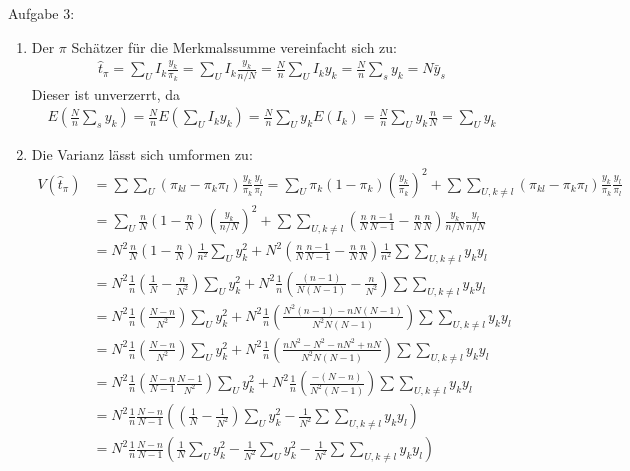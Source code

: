 \begin{Solution}{{Aufgabe 3:}}
	\begin{enumerate}
\item Der $\pi$ Schätzer für die Merkmalssumme vereinfacht sich zu:
\begin{align*}
\hat{t}_\pi = \sum_U I_k \frac{y_k}{\pi_k} = \sum_U I_k \frac{y_k}{n/N} = \frac{N}{n} \sum_U I_k y_k =  \frac{N}{n} \sum_s y_k = N \bar{y}_s
\end{align*}
Dieser ist unverzerrt, da
\begin{align*}
E\left(\frac{N}{n} \sum_s y_k\right) = \frac{N}{n} E\left(\sum_U I_k y_k\right) = \frac{N}{n} \sum_U y_k E(I_k) = \frac{N}{n} \sum_U y_k \frac{n}{N} = \sum_U y_k
\end{align*}
\item Die Varianz lässt sich umformen zu:
\begin{align*}
V(\hat{t}_\pi) &= \sum\sum_U (\pi_{kl}-\pi_k\pi_l)\frac{y_k}{\pi_k}\frac{y_l}{\pi_l}= \sum_U \pi_k(1-\pi_k)\left(\frac{y_k}{\pi_k}\right)^2 + \sum\sum_{U,k\neq l} (\pi_{kl}-\pi_k\pi_l)\frac{y_k}{\pi_k}\frac{y_l}{\pi_l}\\
&= \sum_U \frac{n}{N}\left(1-\frac{n}{N}\right)\left(\frac{y_k}{n/N}\right)^2 + \sum\sum_{U,k\neq l}\left(\frac{n}{N}\frac{n-1}{N-1}-\frac{n}{N}\frac{n}{N}\right)\frac{y_k}{n/N}\frac{y_l}{n/N}\\
&= N^2 \frac{n}{N} \left(1-\frac{n}{N}\right)\frac{1}{n^2}\sum_U y_k^2 + N^2\left(\frac{n}{N}\frac{n-1}{N-1}-\frac{n}{N}\frac{n}{N}\right)\frac{1}{n^2} \sum\sum_{U,k\neq l} y_k y_l\\
&= N^2\frac{1}{n}\left(\frac{1}{N}-\frac{n}{N^2}\right)\sum_U y_k^2 + N^2\frac{1}{n} \left(\frac{(n-1)}{N(N-1)}-\frac{n}{N^2}\right)\sum\sum_{U,k\neq l}y_k y_l\\
&= N^2\frac{1}{n}\left(\frac{N-n}{N^2}\right)\sum_U y_k^2 + N^2 \frac{1}{n}\left(\frac{N^2(n-1)-nN(N-1)}{N^2N(N-1)}\right)\sum\sum_{U,k\neq l}y_ky_l\\
&= N^2\frac{1}{n}\left(\frac{N-n}{N^2}\right)\sum_U y_k^2 + N^2 \frac{1}{n}\left(\frac{nN^2-N^2-nN^2+nN}{N^2N(N-1)}\right)\sum\sum_{U,k\neq l}y_ky_l\\
&= N^2\frac{1}{n}\left(\frac{N-n}{N-1}\frac{N-1}{N^2}\right)\sum_U y_k^2 + N^2 \frac{1}{n}\left(\frac{-(N-n)}{N^2(N-1)}\right)\sum\sum_{U,k\neq l}y_ky_l\\
&= N^2\frac{1}{n}\frac{N-n}{N-1}\left(\left(\frac{1}{N}-\frac{1}{N^2}\right)\sum_U y_k^2 - \frac{1}{N^2}\sum\sum_{U,k\neq l}y_k y_l\right)\\
&= N^2\frac{1}{n}\frac{N-n}{N-1}\left(\frac{1}{N}\sum_U y_k^2 - \frac{1}{N^2} \sum_U y_k^2 - \frac{1}{N^2}\sum\sum_{U,k\neq l}y_k y_l\right)\\

\end{align*}
\end{enumerate}
\end{Solution}
